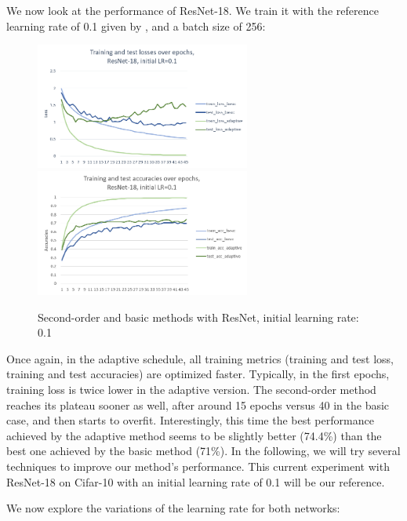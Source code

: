 \documentclass{article}
\begin{document}
  We now look at the performance of ResNet-18. We train it with the reference learning rate of 0.1 given by \cite{he2016deep}, and a batch size of 256:
  
  \begin{figure}[!h]
	\includegraphics[width=200pt]{loss_resnet_0_1.png}
	\includegraphics[width=200pt]{acc_resnet_0_1.png}
	\caption{Second-order and basic methods with ResNet, initial learning rate: 0.1}
  \end{figure}
  
  Once again, in the adaptive schedule, all training metrics (training and test loss, training and test accuracies) are optimized faster. Typically, in the first epochs, training loss is twice lower in the adaptive version. The second-order method reaches its plateau sooner as well, after around 15 epochs versus 40 in the basic case, and then starts to overfit. Interestingly, this time the best performance achieved by the adaptive method seems to be slightly better (74.4\%) than the best one achieved by the basic method (71\%). In the following, we will try several techniques to improve our method's performance. This current experiment with ResNet-18 on Cifar-10 with an initial learning rate of 0.1 will be our reference. 
  
  We now explore the variations of the learning rate for both networks:
  
\end{document}
